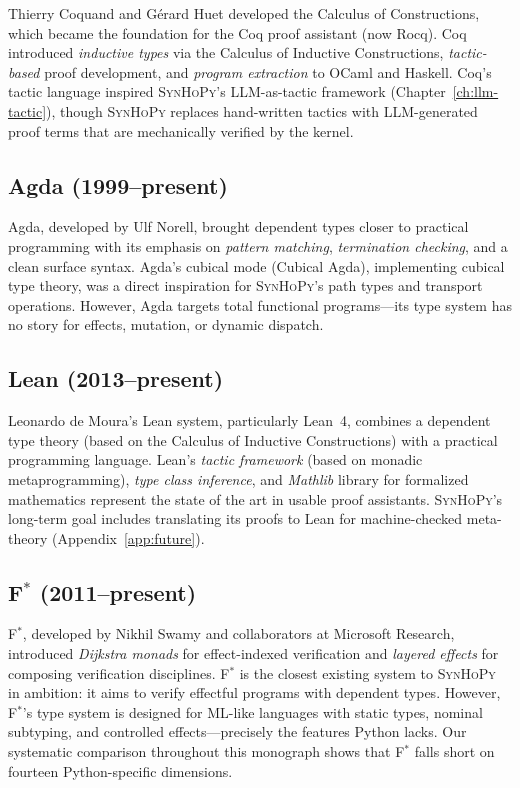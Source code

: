 \documentclass[11pt,a4paper]{report}
\theoremstyle{definition}
\theoremstyle{plain}
\newcommand{\fstar}{F$^{*}$}
\newcommand{\synhopy}{\textsc{SynHoPy}}
\begin{document}
Thierry Coquand and G\'erard Huet developed the Calculus of Constructions,
which became the foundation for the Coq proof assistant (now Rocq).  Coq
introduced \emph{inductive types} via the Calculus of Inductive Constructions,
\emph{tactic-based} proof development, and \emph{program extraction} to
OCaml and Haskell.  Coq's tactic language inspired \synhopy{}'s
LLM-as-tactic framework (Chapter~\ref{ch:llm-tactic}), though \synhopy{}
replaces hand-written tactics with LLM-generated proof terms that are
mechanically verified by the kernel.

\subsection{Agda (1999--present)}

Agda, developed by Ulf Norell, brought dependent types closer to
practical programming with its emphasis on \emph{pattern matching},
\emph{termination checking}, and a clean surface syntax.  Agda's
cubical mode (Cubical Agda), implementing cubical type theory, was a
direct inspiration for \synhopy{}'s path types and transport operations.
However, Agda targets total functional programs---its type system has
no story for effects, mutation, or dynamic dispatch.

\subsection{Lean (2013--present)}

Leonardo de Moura's Lean system, particularly Lean~4, combines
a dependent type theory (based on the Calculus of Inductive
Constructions) with a practical programming language.  Lean's
\emph{tactic framework} (based on monadic metaprogramming),
\emph{type class inference}, and \emph{Mathlib} library for
formalized mathematics represent the state of the art in
usable proof assistants.  \synhopy{}'s long-term goal includes
translating its proofs to Lean for machine-checked meta-theory
(Appendix~\ref{app:future}).

\subsection{F$^*$ (2011--present)}

\fstar{}, developed by Nikhil Swamy and collaborators at Microsoft Research,
introduced \emph{Dijkstra monads} for effect-indexed verification and
\emph{layered effects} for composing verification disciplines.  \fstar{} is
the closest existing system to \synhopy{} in ambition: it aims to verify
effectful programs with dependent types.  However, \fstar{}'s type system
is designed for ML-like languages with static types, nominal subtyping,
and controlled effects---precisely the features Python lacks.  Our
systematic comparison throughout this monograph shows that \fstar{} falls
short on fourteen Python-specific dimensions.
\end{document}
